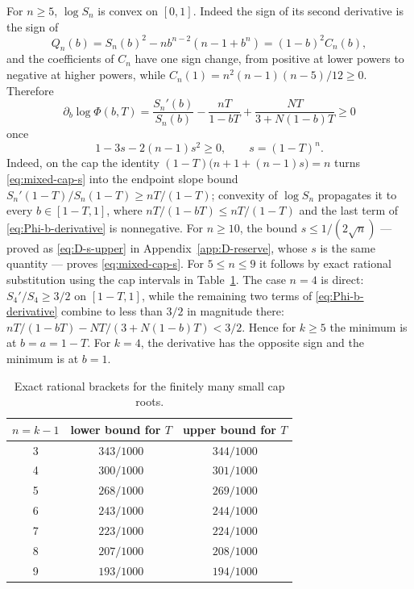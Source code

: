 \documentclass[11pt]{article}
\theoremstyle{definition}
\theoremstyle{remark}
\begin{document}
For $n\ge5$, $\log S_n$ is convex on $[0,1]$.  Indeed the sign of its
second derivative is the sign of
\[
 Q_n(b)=S_n(b)^2-nb^{n-2}(n-1+b^n)=(1-b)^2C_n(b),
\]
and the coefficients of $C_n$ have one sign change, from positive at lower
powers to negative at higher powers, while
$C_n(1)=n^2(n-1)(n-5)/12\ge0$.  Therefore
\begin{equation}\label{eq:Phi-b-derivative}
 \partial_b\log\Phi(b,T)
 =\frac{S_n'(b)}{S_n(b)}-\frac{nT}{1-bT}
 +\frac{NT}{3+N(1-b)T}\ge0
\end{equation}
once
\begin{equation}\label{eq:mixed-cap-s}
 1-3s-2(n-1)s^2\ge0,\qquad s=(1-T)^n.
\end{equation}
Indeed, on the cap the identity $(1-T)\bigl(n+1+(n-1)s\bigr)=n$ turns
\eqref{eq:mixed-cap-s} into the endpoint slope bound
$S_n'(1-T)/S_n(1-T)\ge nT/(1-T)$; convexity of $\log S_n$ propagates it
to every $b\in[1-T,1]$, where $nT/(1-bT)\le nT/(1-T)$ and the last term
of \eqref{eq:Phi-b-derivative} is nonnegative.
For $n\ge10$, the bound $s\le1/(2\sqrt n)$ --- proved as
\eqref{eq:D-s-upper} in Appendix~\ref{app:D-reserve}, whose $s$ is the
same quantity --- proves
\eqref{eq:mixed-cap-s}.  For $5\le n\le9$ it follows by exact rational
substitution using the cap intervals in Table~\ref{tab:cap-intervals}.
The case $n=4$ is direct: $S_4'/S_4\ge3/2$ on $[1-T,1]$, while the
remaining two terms of \eqref{eq:Phi-b-derivative} combine to less than
$3/2$ in magnitude there:
$nT/(1-bT)-NT/(3+N(1-b)T)<3/2$.  Hence for $k\ge5$ the minimum
is at $b=a=1-T$.  For $k=4$, the derivative has the opposite sign and the
minimum is at $b=1$.

\begin{table}[ht]
\centering
\begin{tabular}{c@{\qquad}c@{\qquad}c}
\toprule
$n=k-1$ & lower bound for $T$ & upper bound for $T$\\
\midrule
3 & $343/1000$ & $344/1000$\\
4 & $300/1000$ & $301/1000$\\
5 & $268/1000$ & $269/1000$\\
6 & $243/1000$ & $244/1000$\\
7 & $223/1000$ & $224/1000$\\
8 & $207/1000$ & $208/1000$\\
9 & $193/1000$ & $194/1000$\\
\bottomrule
\end{tabular}
\caption{Exact rational brackets for the finitely many small cap roots.}
\label{tab:cap-intervals}
\end{table}
\end{document}
